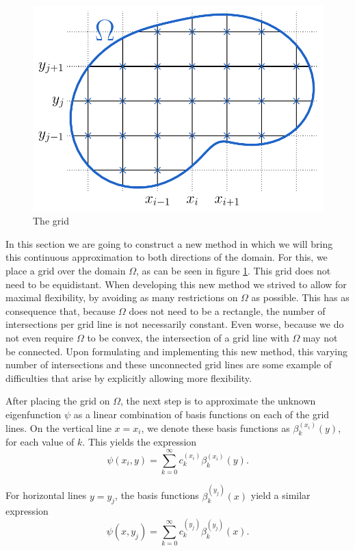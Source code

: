 \begin{figure}
    \begin{center}
        \includegraphics[width=.66\linewidth]{img/chapter4/the_method_grid.pdf}
        \caption{\label{fig:woven_method_grid} The grid}
    \end{center}
\end{figure}

In this section we are going to construct a new method in which we will bring this continuous approximation to both directions of the domain. For this, we place a grid over the domain $\Omega$, as can be seen in figure \ref{fig:woven_method_grid}. This grid does not need to be equidistant. When developing this new method we strived to allow for maximal flexibility, by avoiding as many restrictions on $\Omega$ as possible. This has as consequence that, because $\Omega$ does not need to be a rectangle, the number of intersections per grid line is not necessarily constant. Even worse, because we do not even require $\Omega$ to be convex, the intersection of a grid line with $\Omega$ may not be connected. Upon formulating and implementing this new method, this varying number of intersections and these unconnected grid lines are some example of difficulties that arise by explicitly allowing more flexibility.

After placing the grid on $\Omega$, the next step is to approximate the unknown eigenfunction $\psi$ as a linear combination of basis functions on each of the grid lines. On the vertical line $x = x_i$, we denote these basis functions as $\beta_k^{(x_i)}(y)$, for each value of $k$. This yields the expression
\begin{equation}\label{equ:c4_expression_on_lines_x}
    \psi(x_i, y) = \sum_{k=0}^\infty c_k^{(x_i)} \beta_k^{(x_i)}(y) \text{.}
\end{equation}

For horizontal lines $y = y_j$, the basis functions $\beta_k^{(y_j)}(x)$ yield a similar expression
\begin{equation}\label{equ:c4_expression_on_lines_y}
    \psi(x, y_j) = \sum_{k=0}^\infty c_k^{(y_j)} \beta_k^{(y_j)}(x) \text{.}
\end{equation}

